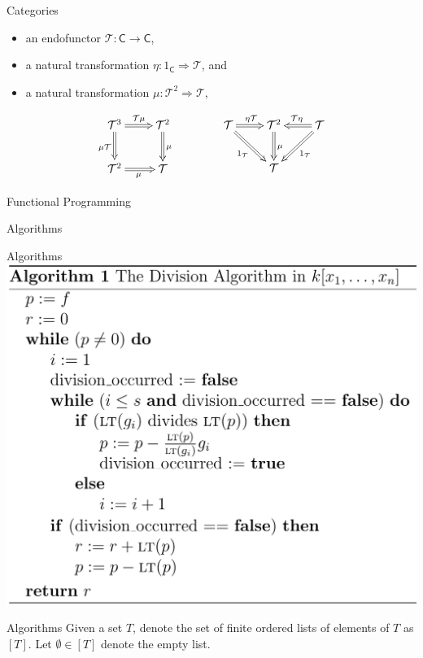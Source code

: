 \documentclass{beamer}
\def\sC{\mathsf{C}}
\def\cT{\mathcal{T}}
\begin{document}
\begin{frame}{Categories}
  \begin{definition}[Monad]
    \begin{itemize}
      \item an endofunctor $\cT: \sC \to \sC$,
      \item a natural transformation $\eta: 1_\sC \Rightarrow \cT$, and
      \item a natural transformation $\mu: \cT^2 \Rightarrow \cT$,
    \end{itemize}
    \[ \SelectTips{cm}{}\xymatrix{
    \cT^3 \ar@{=>}[r]^{\cT\mu} \ar@{=>}[d]_{\mu \cT} & \cT^2 \ar@{=>}[d]^\mu \\ \cT^2 \ar@{=>}[r]_\mu & \cT
    } \qquad\qquad \SelectTips{cm}{}\xymatrix{
    \cT \ar@{=>}[r]^{\eta \cT} \ar@{=>}[dr]_{1_\cT} & \cT^2 \ar@{=>}[d]^\mu & \cT \ar@{=>}[l]_{\cT\eta} \ar@{=>}[dl]^{1_\cT} \\ & \cT &
    } \]
  \end{definition}
\end{frame}

\begin{frame}{Functional Programming}
\end{frame}

\begin{frame}{Algorithms}
\end{frame}

\begin{frame}{Algorithms}
  \includegraphics[width=.75\textwidth]{DivisionAlgorithm.png}
\end{frame}

\begin{frame}{Algorithms}
  Given a set $T$, denote the set of finite ordered lists of elements of $T$ as $[T]$. Let $\emptyset \in [T]$ denote the empty list.
\end{frame}
\end{document}
